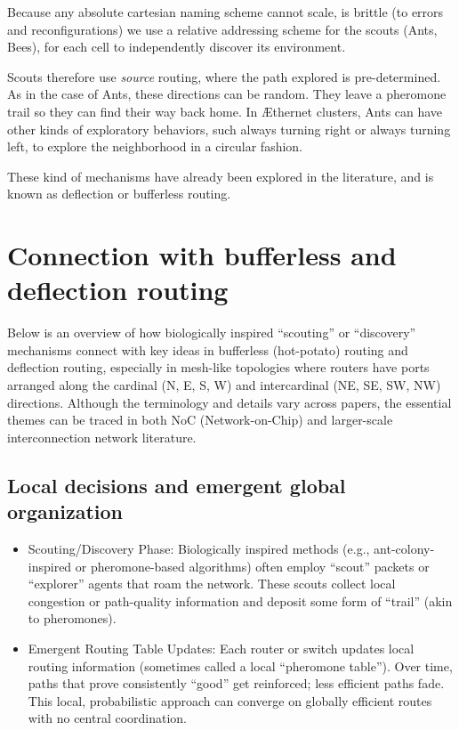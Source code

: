 \documentclass[../HFT-main.tex]{subfiles} %
\begin{document}
Because any absolute cartesian naming scheme cannot scale, is brittle (to errors and reconfigurations) we use a relative addressing scheme for the scouts (Ants, Bees), for each cell to independently discover its environment. 

Scouts  therefore use \emph{source} routing, where the path explored is pre-determined. As in the case of Ants, these directions can be random. They leave a pheromone trail so they can find their way back home.  In Æthernet clusters, Ants can have other kinds of exploratory behaviors, such always turning right or always turning left, to explore the neighborhood in a circular fashion. 

These kind of mechanisms have already been explored in the literature, and is known as deflection or bufferless routing. 

\section{Connection with bufferless and deflection routing}

Below is an overview of how biologically inspired “scouting” or “discovery” mechanisms connect with key ideas in bufferless (hot-potato) routing and deflection routing, especially in mesh-like topologies where routers have ports arranged along the cardinal (N, E, S, W) and intercardinal (NE, SE, SW, NW) directions. Although the terminology and details vary across papers, the essential themes can be traced in both NoC (Network-on-Chip) and larger-scale interconnection network literature.


\subsection{Local decisions and emergent global organization}


\begin{itemize}
\item Scouting/Discovery Phase: Biologically inspired methods (e.g., ant-colony-inspired or pheromone-based algorithms) often employ “scout” packets or “explorer” agents that roam the network. These scouts collect local congestion or path-quality information and deposit some form of “trail” (akin to pheromones).
\item Emergent Routing Table Updates: Each router or switch updates local routing information (sometimes called a local “pheromone table”). Over time, paths that prove consistently “good” get reinforced; less efficient paths fade. This local, probabilistic approach can converge on globally efficient routes with no central coordination.
\end{itemize}
\end{document}
